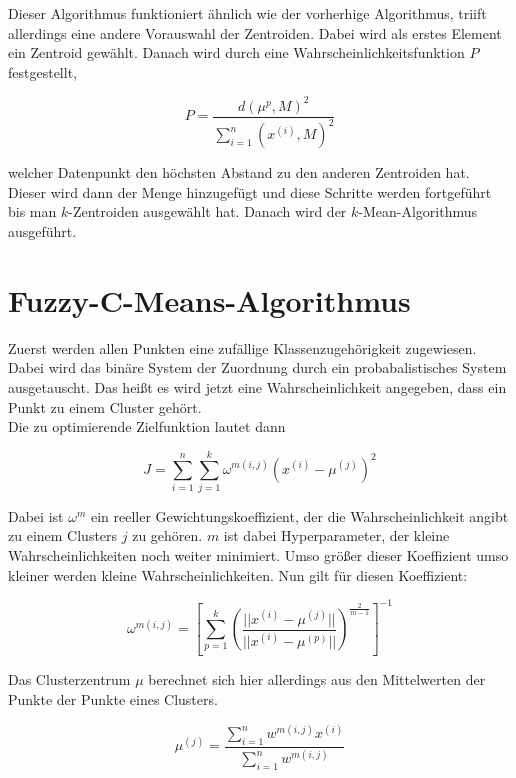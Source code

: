 \documentclass[11pt]{article} %
\begin{document}
Dieser Algorithmus funktioniert ähnlich wie der vorherhige Algorithmus, triift allerdings eine andere Vorauswahl der Zentroiden. Dabei wird als erstes Element ein Zentroid gewählt. Danach wird durch eine Wahrscheinlichkeitsfunktion $P$ festgestellt, 

\begin{equation}
P = \frac{d(\mu^p,M)^2}{\sum_{i=1}^n (x^{(i)}, M)^2}
\end{equation}

welcher Datenpunkt den höchsten Abstand zu den anderen Zentroiden hat. Dieser wird dann der Menge hinzugefügt und diese Schritte werden fortgeführt bis man $k$-Zentroiden ausgewählt hat. Danach wird der $k$-Mean-Algorithmus ausgeführt.

\section{Fuzzy-C-Means-Algorithmus}
Zuerst werden allen Punkten eine zufällige Klassenzugehörigkeit zugewiesen. 
Dabei wird das binäre System der Zuordnung durch ein probabalistisches System ausgetauscht. Das heißt es wird jetzt eine Wahrscheinlichkeit angegeben, dass ein Punkt zu einem Cluster gehört. \\ 
Die zu optimierende Zielfunktion lautet dann

\begin{equation}
J = \sum_{i=1}^n \sum_{j=1}^k \omega^{m(i,j)} (x^{(i)}-\mu^{(j)})^2 
\end{equation}

Dabei ist $\omega^m$ ein reeller Gewichtungskoeffizient, der die Wahrscheinlichkeit angibt zu einem Clusters $j$ zu gehören.
$m$ ist dabei Hyperparameter, der kleine Wahrscheinlichkeiten noch weiter minimiert. Umso größer dieser Koeffizient umso kleiner werden kleine Wahrscheinlichkeiten. Nun gilt für diesen Koeffizient:

\begin{equation}
\omega^{m (i,j)} = [\sum_{p=1} ^k (\frac{||x^{(i)} - \mu^{(j)}||}{||x^{(i)} - \mu^{(p)}||})^{\frac{2}{m-1}}  ]^{-1}
\end{equation}

Das Clusterzentrum $\mu$ berechnet sich hier allerdings aus den Mittelwerten der Punkte der Punkte eines Clusters.

\begin{equation}
\mu^{(j)} = \frac{\sum_{i=1}^n w^{m (i,j)} x^{(i)} } {\sum_{i=1}^n w^{m (i,j)}}
\end{equation}
 
\end{document}
